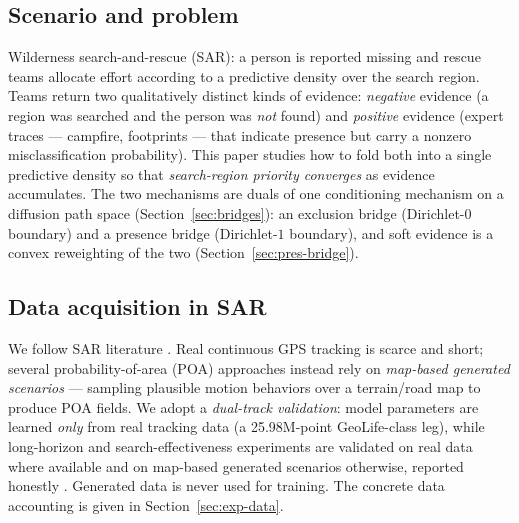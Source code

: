 \documentclass[11pt]{article}
\begin{document}
\subsection{Scenario and problem}
\label{sec:scenario}
Wilderness search-and-rescue (SAR): a person is reported missing and rescue teams
allocate effort according to a predictive density over the search region. Teams return
two qualitatively distinct kinds of evidence: \emph{negative} evidence (a region was
searched and the person was \emph{not} found) and \emph{positive} evidence (expert
traces --- campfire, footprints --- that indicate presence but carry a nonzero
misclassification probability). This paper studies how to fold both into a single
predictive density so that \emph{search-region priority converges} as evidence
accumulates. The two mechanisms are duals of one conditioning mechanism on a diffusion
path space (Section~\ref{sec:bridges}): an exclusion bridge (Dirichlet-$0$ boundary) and
a presence bridge (Dirichlet-$1$ boundary), and soft evidence is a convex
reweighting of the two (Section~\ref{sec:pres-bridge}).

\subsection{Data acquisition in SAR}
\label{sec:dataacq}
We follow SAR literature \cite{koester2008,stone2004}. Real continuous GPS tracking is
scarce and short; several probability-of-area (POA) approaches instead rely on
\emph{map-based generated scenarios} --- sampling plausible motion behaviors over a
terrain/road map to produce POA fields. We adopt a \emph{dual-track validation}:
model parameters are learned \emph{only} from real tracking data (a 25.98M-point
GeoLife-class leg), while long-horizon and search-effectiveness experiments are
validated on real data where available and on map-based generated scenarios otherwise,
reported honestly \cite{zheng2010geolife,zheng2015trajectory,osm2026}. Generated data is
never used for training. The concrete data accounting is given in
Section~\ref{sec:exp-data}.
\end{document}
